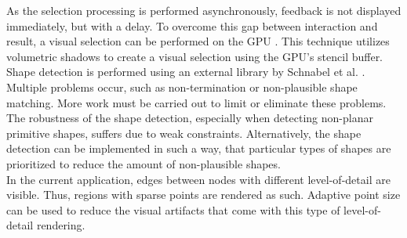 As the selection processing is performed asynchronously, feedback is not displayed immediately, but with a delay. To overcome this gap between interaction and result, a visual selection can be performed on the GPU \cite{rainer2016visual}. This technique utilizes volumetric shadows to create a visual selection using the GPU's stencil buffer. 
\\

Shape detection is performed using an external library by Schnabel et al. \cite{schnabel-2007-software}. Multiple problems occur, such as non-termination or non-plausible shape matching. More work must be carried out to limit or eliminate these problems. The robustness of the shape detection, especially when detecting non-planar primitive shapes, suffers due to weak constraints. Alternatively, the shape detection can be implemented in such a way, that particular types of shapes are prioritized to reduce the amount of non-plausible shapes. 
\\

In the current application, edges between nodes with different level-of-detail are visible. Thus, regions with sparse points are rendered as such. Adaptive point size can be used to reduce the visual artifacts that come with this type of level-of-detail rendering. 
